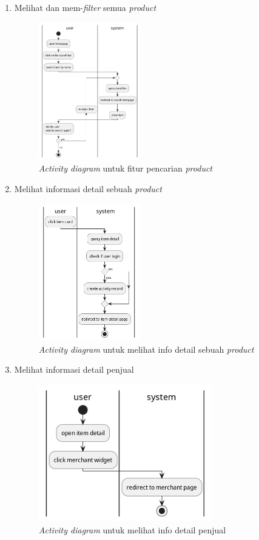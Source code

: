 \documentclass[a4paper]{article}
\begin{document}
\begin{enumerate}
\begin{enumerate}
        \item Melihat dan mem-\textit{filter} semua \textit{product}
        \begin{figure}[h]
            \centering
            \includegraphics*[height=6cm]{./diagram/activity diagram/9. search item/search item.png}
            \caption{\textit{Activity diagram} untuk fitur pencarian \textit{product}}
        \end{figure}
        \item Melihat informasi detail sebuah \textit{product}
        \begin{figure}[h]
            \centering
            \includegraphics*[height=6cm]{./diagram/activity diagram/10. see item detail/see item detail.png}
            \caption{\textit{Activity diagram} untuk melihat info detail sebuah \textit{product}}
        \end{figure}
        \newpage

        \item Melihat informasi detail penjual
        \begin{figure}[h]
            \centering
            \includegraphics*[height=6cm]{./diagram/activity diagram/11. view merchant page/view merchant page.png}
            \caption{\textit{Activity diagram} untuk melihat info detail penjual}
        \end{figure}


\end{enumerate}
\end{enumerate}
\end{document}
